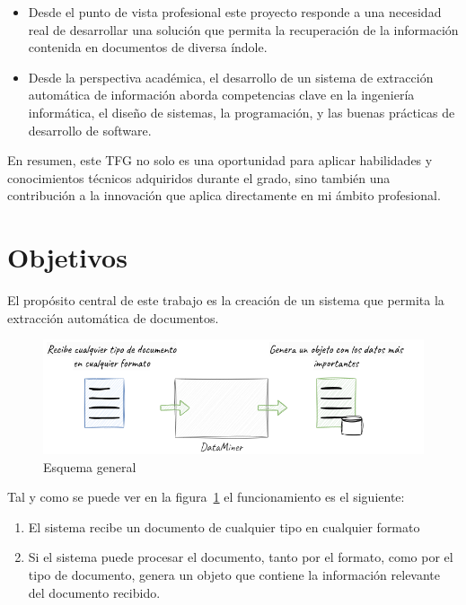 \begin{itemize}
    \item
    Desde el punto de vista profesional este proyecto responde a una necesidad real de desarrollar una solución
    que permita la recuperación de la información contenida en documentos de diversa índole.
    \item
    Desde la perspectiva académica, el desarrollo de un sistema de extracción automática de información aborda
    competencias clave en la ingeniería informática, el diseño de sistemas, la programación, y las buenas prácticas de
    desarrollo de software.
\end{itemize}

En resumen, este TFG no solo es una oportunidad para aplicar habilidades y conocimientos técnicos adquiridos durante el
grado, sino también una contribución a la innovación que aplica directamente en mi ámbito profesional.


\section{Objetivos}

El propósito central de este trabajo es la creación de un sistema que permita la extracción automática de documentos.

\begin{figure}[ht]
    \begin{center}
        \includegraphics[width=\textwidth]{./chapter/images/chapter_1.overview}
        \caption{Esquema general}
        \label{fig:chapter_1.overview}
    \end{center}
\end{figure}

Tal y como se puede ver en la figura~\ref{fig:chapter_1.overview} el funcionamiento es el siguiente:

\begin{enumerate}
    \item El sistema recibe un documento de cualquier tipo en cualquier formato
    \item
    Si el sistema puede procesar el documento, tanto por el formato, como por el tipo de documento, genera un objeto que
    contiene la información relevante del documento recibido.
\end{enumerate}

